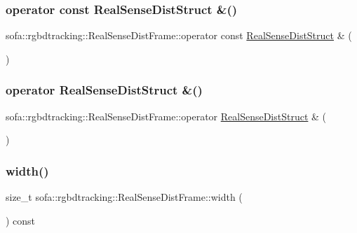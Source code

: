 \subsubsection{\texorpdfstring{operator const Real\+Sense\+Dist\+Struct \&()}{operator const RealSenseDistStruct \&()}}
{\footnotesize\ttfamily sofa\+::rgbdtracking\+::\+Real\+Sense\+Dist\+Frame\+::operator const \hyperlink{structsofa_1_1rgbdtracking_1_1_real_sense_dist_frame_1_1_real_sense_dist_struct}{Real\+Sense\+Dist\+Struct} \& (\begin{DoxyParamCaption}{ }\end{DoxyParamCaption})\hspace{0.3cm}{\ttfamily [inline]}}

\mbox{\label{classsofa_1_1rgbdtracking_1_1_real_sense_dist_frame_a6bea0bb06a130b94dc9066c60a22a4e1}} 
\subsubsection{\texorpdfstring{operator Real\+Sense\+Dist\+Struct \&()}{operator RealSenseDistStruct \&()}}
{\footnotesize\ttfamily sofa\+::rgbdtracking\+::\+Real\+Sense\+Dist\+Frame\+::operator \hyperlink{structsofa_1_1rgbdtracking_1_1_real_sense_dist_frame_1_1_real_sense_dist_struct}{Real\+Sense\+Dist\+Struct} \& (\begin{DoxyParamCaption}{ }\end{DoxyParamCaption})\hspace{0.3cm}{\ttfamily [inline]}}

\mbox{\label{classsofa_1_1rgbdtracking_1_1_real_sense_dist_frame_a95d9d7721c43df3754b482467062dfe9}} 
\subsubsection{\texorpdfstring{width()}{width()}}
{\footnotesize\ttfamily size\+\_\+t sofa\+::rgbdtracking\+::\+Real\+Sense\+Dist\+Frame\+::width (\begin{DoxyParamCaption}{ }\end{DoxyParamCaption}) const\hspace{0.3cm}{\ttfamily [inline]}}



